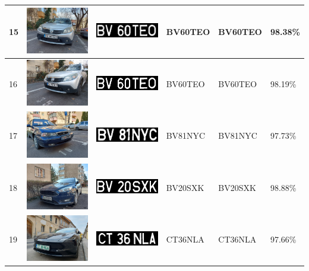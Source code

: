 \documentclass[a4paper,12pt]{report}
\begin{document}
\begin{longtable}{| m{0.6cm} | m{3cm} | m{3cm} | m{1.8cm} | m{1.8cm} | m{1.8cm} |}
        15 & \includegraphics[width=3cm,keepaspectratio]{dataset/7_d1.jpg} & \includegraphics[width=3cm,keepaspectratio]{segmentari/15.jpg} & BV60TEO & BV60TEO & 98.38\% \\ \hline
        16 & \includegraphics[width=3cm,keepaspectratio]{dataset/7_d2.jpg} & \includegraphics[width=3cm,keepaspectratio]{segmentari/16.jpg} & BV60TEO & BV60TEO & 98.19\% \\ \hline
        17 & \includegraphics[width=3cm,keepaspectratio]{dataset/8_s1.jpg} & \includegraphics[width=3cm,keepaspectratio]{segmentari/17.jpg} & BV81NYC & BV81NYC & 97.73\% \\ \hline
        18 & \includegraphics[width=3cm,keepaspectratio]{dataset/9_d1.jpg} & \includegraphics[width=3cm,keepaspectratio]{segmentari/18.jpg} & BV20SXK & BV20SXK & 98.88\% \\ \hline
        19 & \includegraphics[width=3cm,keepaspectratio]{dataset/10_d1.jpg} & \includegraphics[width=3cm,keepaspectratio]{segmentari/19.jpg} & CT36NLA & CT36NLA & 97.66\% \\ \hline

\end{longtable}
\end{document}
